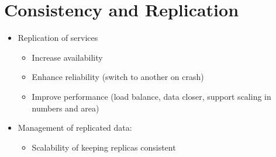 \section{Consistency and Replication}
\begin{itemize}
	\item Replication of services
	\begin{itemize}
		\item Increase availability
		\item Enhance reliability (switch to another on crash)
		\item Improve performance (load balance, data closer, support scaling in numbers and area)
	\end{itemize}
	\item Management of replicated data:
	\begin{itemize}
		\item Scalability of keeping replicas consistent	
	\end{itemize}
\end{itemize}

